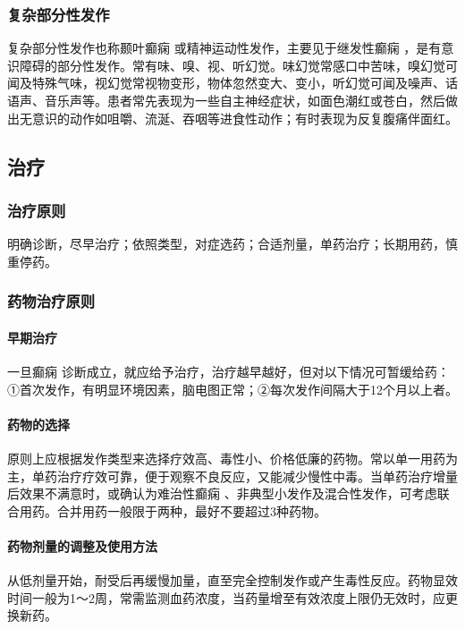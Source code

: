 \subsubsection{复杂部分性发作}

复杂部分性发作也称颞叶癫痫
或精神运动性发作，主要见于继发性癫痫
，是有意识障碍的部分性发作。常有味、嗅、视、听幻觉。味幻觉常感口中苦味，嗅幻觉可闻及特殊气味，视幻觉常视物变形，物体忽然变大、变小，听幻觉可闻及噪声、话语声、音乐声等。患者常先表现为一些自主神经症状，如面色潮红或苍白，然后做出无意识的动作如咀嚼、流涎、吞咽等进食性动作；有时表现为反复腹痛伴面红。

\subsection{治疗}

\subsubsection{治疗原则}

明确诊断，尽早治疗；依照类型，对症选药；合适剂量，单药治疗；长期用药，慎重停药。

\subsubsection{药物治疗原则}
\paragraph{早期治疗}

一旦癫痫
诊断成立，就应给予治疗，治疗越早越好，但对以下情况可暂缓给药：①首次发作，有明显环境因素，脑电图正常；②每次发作间隔大于12个月以上者。
\paragraph{药物的选择}

原则上应根据发作类型来选择疗效高、毒性小、价格低廉的药物。常以单一用药为主，单药治疗疗效可靠，便于观察不良反应，又能减少慢性中毒。当单药治疗增量后效果不满意时，或确认为难治性癫痫
、非典型小发作及混合性发作，可考虑联合用药。合并用药一般限于两种，最好不要超过3种药物。
\paragraph{药物剂量的调整及使用方法}

从低剂量开始，耐受后再缓慢加量，直至完全控制发作或产生毒性反应。药物显效时间一般为1～2周，常需监测血药浓度，当药量增至有效浓度上限仍无效时，应更换新药。
